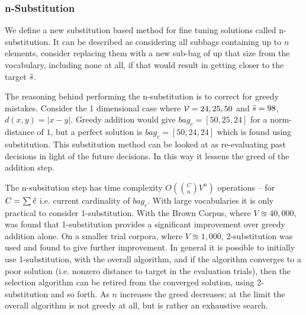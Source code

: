 \documentclass[11pt]{article}
\theoremstyle{plain}
\theoremstyle{definition}
\begin{document}
\subsubsection{n-Substitution}
We define a new substitution based method for fine tuning solutions called n-substitution. It can be described as considering all subbags containing up to $n$ elements, consider replacing them with a new sub-bag of up that size from the vocabulary, including none at all, if that would result in getting closer to the target $\tilde{s}$. 

The reasoning behind performing the n-substitution is to correct for greedy mistakes. Consider the 1 dimensional case where $\mathcal{V}={24,25,50}$ and $\tilde{s}=98$, $d(x,y)=\left|x-y\right|$. Greedy addition would give  $bag_c=[50,25,24]$ for a norm-distance of $1$, but a perfect solution  is $bag_c=[50,24,24]$ which is found using  substitution. This substitution method can be looked at as re-evaluating past decisions in light of the future decisions. In this way it lessens the greed of the addition step. 

The n-subsitution step has time complexity $O(\binom{C}{n}V^n)$ operations -- for $C=\sum \tilde{c}$ i.e. current cardinality of $bag_c$. With large vocabularies it is only practical to consider 1-substitution. With the Brown Corpus, where $V\approxeq 40,000$, was found that 1-substitution provides a significant improvement over greedy addition alone. On a smaller trial corpora, where $V\approxeq 1,000$, 2-substitution was used and found to give further improvement. In general it is possible to initially use 1-substitution, with the overall algorithm, and if the algorithm converges to a poor solution (i.e. nonzero distance to target in the evaluation trials), then the selection algorithm can be retired from the converged solution, using 2-substitution and so forth. As $n$ increases the greed decreases; at the limit the overall algorithm is not greedy at all, but is rather an exhaustive search.
\end{document}

